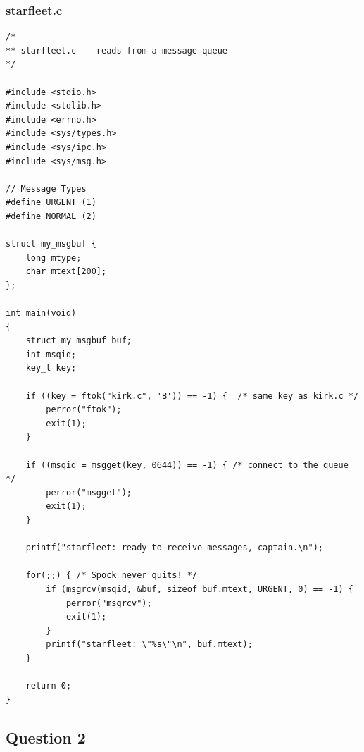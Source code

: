 \documentclass[12pt,a4paper,oneside]{article}
\begin{document}
\subsubsection{starfleet.c}
\begin{lstlisting}[basicstyle=\scriptsize,style=ElliottCListingStyle]
/*
** starfleet.c -- reads from a message queue
*/

#include <stdio.h>
#include <stdlib.h>
#include <errno.h>
#include <sys/types.h>
#include <sys/ipc.h>
#include <sys/msg.h>

// Message Types
#define URGENT (1)
#define NORMAL (2)

struct my_msgbuf {
	long mtype;
	char mtext[200];
};

int main(void)
{
	struct my_msgbuf buf;
	int msqid;
	key_t key;

	if ((key = ftok("kirk.c", 'B')) == -1) {  /* same key as kirk.c */
		perror("ftok");
		exit(1);
	}

	if ((msqid = msgget(key, 0644)) == -1) { /* connect to the queue */
		perror("msgget");
		exit(1);
	}
	
	printf("starfleet: ready to receive messages, captain.\n");

	for(;;) { /* Spock never quits! */
		if (msgrcv(msqid, &buf, sizeof buf.mtext, URGENT, 0) == -1) {
			perror("msgrcv");
			exit(1);
		}
		printf("starfleet: \"%s\"\n", buf.mtext);
	}

	return 0;
}
\end{lstlisting}

\newpage
\subsection{Question 2}
\end{document}
